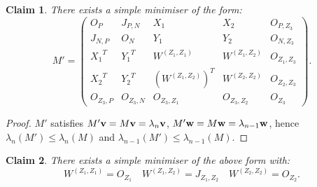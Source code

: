 \documentclass[12pt]{article}
\newtheorem*{claim}{Claim}
\begin{document}
\begin{claim} There exists a simple minimiser of the form:
\begin{equation*}
   M' = \begin{pmatrix} O_{P} & J_{P,N} & X_1 & X_2 & O_{P,Z_3} \\ J_{N,P} & O_{N} & Y_1 & Y_2 & O_{N,Z_3}\\ {X_1}^T & {Y_1}^T & W^{(Z_1,Z_1)} & W^{(Z_1,Z_2)} & O_{Z_1,Z_3} \\ {X_2}^T & {Y_2}^T & ({W^{(Z_1,Z_2)}})^T & W^{(Z_2,Z_2)}  & O_{Z_2,Z_3} \\ O_{Z_3,P} & O_{Z_3,N} & O_{Z_3,Z_1} & O_{Z_3,Z_2} & O_{Z_3}
        \end{pmatrix}.
\end{equation*}
\end{claim}
\begin{proof}
$M'$ satisfies $M'\bold{v} = M \bold{v} = \lambda_{n}\bold{v}$, $M'\bold{w} = M \bold{w} = \lambda_{n-1}\bold{w}$, hence $\lambda_{n}(M') \le \lambda_{n}(M)$ and $\lambda_{n-1}(M') \le \lambda_{n-1}(M)$.
\end{proof}
\begin{claim}
    There exists a simple minimiser of the above form with:
    \begin{equation*}
        W^{(Z_1,Z_1)} = O_{Z_1} \quad W^{(Z_1,Z_2)}= J_{Z_1,Z_2} \quad W^{(Z_2,Z_2)} = O_{Z_2}.
    \end{equation*}
\end{claim}
\end{document}
